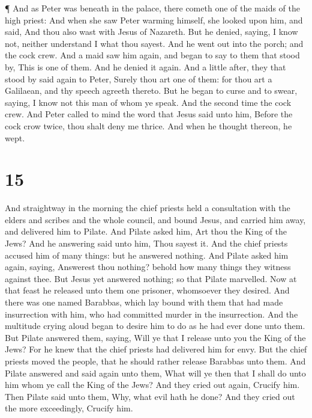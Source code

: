  ¶ And as Peter was beneath in the palace, there cometh one
of the maids of the high priest:  And when she saw Peter
warming himself, she looked upon him, and said, And thou also wast with
Jesus of Nazareth.  But he denied, saying, I know not,
neither understand I what thou sayest. And he went out into the porch;
and the cock crew.  And a maid saw him again, and began to
say to them that stood by, This is one of them.  And he
denied it again. And a little after, they that stood by said again to
Peter, Surely thou art one of them: for thou art a Galilaean, and thy
speech agreeth thereto.  But he began to curse and to
swear, saying, I know not this man of whom ye speak.  And
the second time the cock crew. And Peter called to mind the word that
Jesus said unto him, Before the cock crow twice, thou shalt deny me
thrice. And when he thought thereon, he wept.

\hypertarget{section-14}{%
\section{15}\label{section-14}}

 And straightway in the morning the chief priests held a
consultation with the elders and scribes and the whole council, and
bound Jesus, and carried him away, and delivered him to Pilate.
 And Pilate asked him, Art thou the King of the Jews? And he
answering said unto him, Thou sayest it.  And the chief
priests accused him of many things: but he answered nothing.
 And Pilate asked him again, saying, Answerest thou nothing?
behold how many things they witness against thee.  But Jesus
yet answered nothing; so that Pilate marvelled.  Now at that
feast he released unto them one prisoner, whomsoever they desired.
 And there was one named Barabbas, which lay bound with them
that had made insurrection with him, who had committed murder in the
insurrection.  And the multitude crying aloud began to
desire him to do as he had ever done unto them.  But Pilate
answered them, saying, Will ye that I release unto you the King of the
Jews?  For he knew that the chief priests had delivered him
for envy.  But the chief priests moved the people, that he
should rather release Barabbas unto them.  And Pilate
answered and said again unto them, What will ye then that I shall do
unto him whom ye call the King of the Jews?  And they cried
out again, Crucify him.  Then Pilate said unto them, Why,
what evil hath he done? And they cried out the more exceedingly, Crucify
him.


